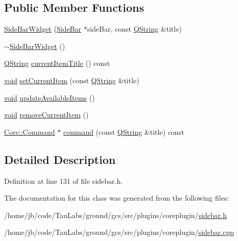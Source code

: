 \subsection*{\-Public \-Member \-Functions}
\begin{DoxyCompactItemize}
\item 
\hyperlink{group___core_plugin_ga05b9f381c803ca75f9a413b708dc6543}{\-Side\-Bar\-Widget} (\hyperlink{class_core_1_1_side_bar}{\-Side\-Bar} $\ast$side\-Bar, const \hyperlink{group___u_a_v_objects_plugin_gab9d252f49c333c94a72f97ce3105a32d}{\-Q\-String} \&title)
\item 
\hyperlink{group___core_plugin_ga03a53332691935e2f86144d2f01f7122}{$\sim$\-Side\-Bar\-Widget} ()
\item 
\hyperlink{group___u_a_v_objects_plugin_gab9d252f49c333c94a72f97ce3105a32d}{\-Q\-String} \hyperlink{group___core_plugin_ga616b42637031be9467727f8aafc3688c}{current\-Item\-Title} () const 
\item 
\hyperlink{group___u_a_v_objects_plugin_ga444cf2ff3f0ecbe028adce838d373f5c}{void} \hyperlink{group___core_plugin_gac0171c31bb1c43972964719b80d90bd3}{set\-Current\-Item} (const \hyperlink{group___u_a_v_objects_plugin_gab9d252f49c333c94a72f97ce3105a32d}{\-Q\-String} \&title)
\item 
\hyperlink{group___u_a_v_objects_plugin_ga444cf2ff3f0ecbe028adce838d373f5c}{void} \hyperlink{group___core_plugin_ga38a71241994574323683189ac604d0ce}{update\-Available\-Items} ()
\item 
\hyperlink{group___u_a_v_objects_plugin_ga444cf2ff3f0ecbe028adce838d373f5c}{void} \hyperlink{group___core_plugin_ga3d37b6d895d022af1fe5cbd59b3c799e}{remove\-Current\-Item} ()
\item 
\hyperlink{class_core_1_1_command}{\-Core\-::\-Command} $\ast$ \hyperlink{group___core_plugin_ga312aa5e5e65485860c3134e9d8f774f1}{command} (const \hyperlink{group___u_a_v_objects_plugin_gab9d252f49c333c94a72f97ce3105a32d}{\-Q\-String} \&title) const 
\end{DoxyCompactItemize}


\subsection{\-Detailed \-Description}


\-Definition at line 131 of file sidebar.\-h.



\-The documentation for this class was generated from the following files\-:\begin{DoxyCompactItemize}
\item 
/home/jb/code/\-Tau\-Labs/ground/gcs/src/plugins/coreplugin/\hyperlink{sidebar_8h}{sidebar.\-h}\item 
/home/jb/code/\-Tau\-Labs/ground/gcs/src/plugins/coreplugin/\hyperlink{sidebar_8cpp}{sidebar.\-cpp}\end{DoxyCompactItemize}
